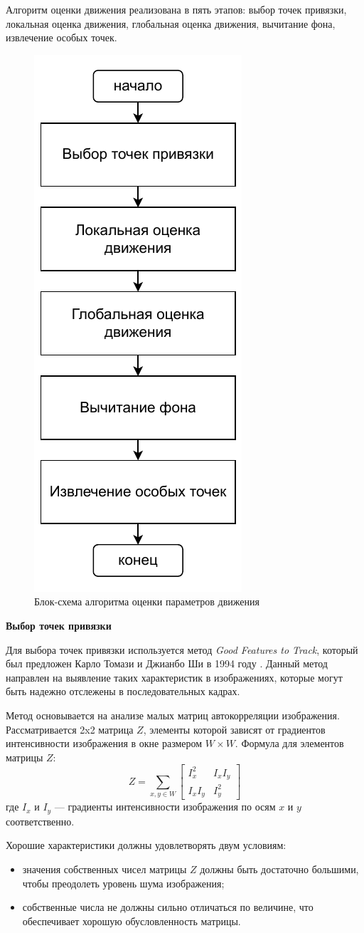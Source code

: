 Алгоритм оценки движения реализована в пять этапов: выбор точек привязки, локальная оценка движения, глобальная оценка движения, вычитание фона, извлечение особых точек.
  \begin{figure}[ht!]
    \centering
    \includegraphics[width=0.3\linewidth]{my_folder/images/движение.pdf}
    \caption{Блок-схема алгоритма оценки параметров движения}
    \label{fig:dvizh}
\end{figure}

\textbf{Выбор точек привязки}

Для выбора точек привязки используется метод \textit{Good Features to Track}, который был предложен Карло Томази и Джианбо Ши в 1994 году \cite{goodTruck}. Данный метод направлен на выявление таких характеристик в изображениях, которые могут быть надежно отслежены в последовательных кадрах.

Метод основывается на анализе малых матриц автокорреляции изображения. Рассматривается 2x2 матрица \( Z \), элементы которой зависят от градиентов интенсивности изображения в окне размером \( W \times W \). Формула для элементов матрицы \( Z \):
   \begin{equation}
   Z = \sum_{x, y \in W} \begin{bmatrix} I_x^2 & I_x I_y \\ I_x I_y & I_y^2 \end{bmatrix}
   \end{equation}
   где \( I_x \) и \( I_y \) — градиенты интенсивности изображения по осям \( x \) и \( y \) соответственно.

Хорошие характеристики должны удовлетворять двум условиям:
\begin{itemize}
\item значения собственных чисел матрицы \( Z \) должны быть достаточно большими, чтобы преодолеть уровень шума изображения;
\item собственные числа не должны сильно отличаться по величине, что обеспечивает хорошую обусловленность матрицы.
\end{itemize}

